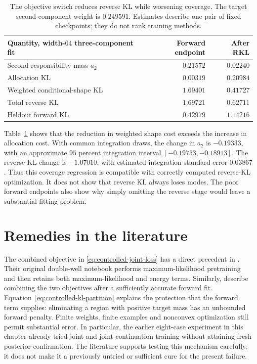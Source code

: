 \begin{table}[htbp]
 \centering
 \begin{tabular}{lrr}
  \toprule
  Quantity, width-$64$ three-component fit & Forward endpoint & After RKL\\
  \midrule
  Second responsibility mass $a_2$ & $0.21572$ & $0.02240$\\
  Allocation KL & $0.00319$ & $0.20984$\\
  Weighted conditional-shape KL & $1.69401$ & $0.41727$\\
  Total reverse KL & $1.69721$ & $0.62711$\\
  Heldout forward KL & $0.42979$ & $1.14216$\\
  \bottomrule
 \end{tabular}
 \caption{The objective switch reduces reverse KL while worsening coverage.
 The target second-component weight is $0.249591$. Estimates describe one
 pair of fixed checkpoints; they do not rank training methods.}
 \label{tab:neutra-objective-switch-attribution}
\end{table}

Table~\ref{tab:neutra-objective-switch-attribution} shows that the reduction
in weighted shape cost exceeds the increase in allocation cost. With common
integration draws, the change in $a_2$ is $-0.19333$, with an approximate
$95$ percent integration interval $[-0.19753,-0.18913]$. The reverse-KL
change is $-1.07010$, with estimated integration standard error $0.03867$.
Thus this coverage regression is compatible with correctly computed
reverse-KL optimization. It does not show that reverse KL always loses modes.
The poor forward endpoints also show why simply omitting the reverse stage
would leave a substantial fitting problem.

\section[Published remedies]{Remedies in the literature}
\label{sec:neutra-literature-remedies}

The combined objective in \eqref{eq:controlled-joint-loss} has a direct
precedent in \citet[][Methods, Eq.~(9)]{noe2019boltzmanngenerators}.
Their original double-well notebook performs maximum-likelihood pretraining
and then retains both maximum-likelihood and energy terms. Similarly,
\citet[][Sec.~III.B and Appendix~A.2]{gabrie2022adaptiveflows} describe
combining the two objectives after a sufficiently accurate forward fit.
Equation~\eqref{eq:controlled-kl-partition} explains the protection that
the forward term supplies: eliminating a region with positive target mass
has an unbounded forward penalty. Finite weights, finite examples and
nonconvex optimization still permit substantial error. In particular, the
earlier eight-case experiment in this chapter already tried joint and
joint-continuation training without attaining fresh posterior confirmation.
The literature supports testing this mechanism carefully; it does not make
it a previously untried or sufficient cure for the present failure.

